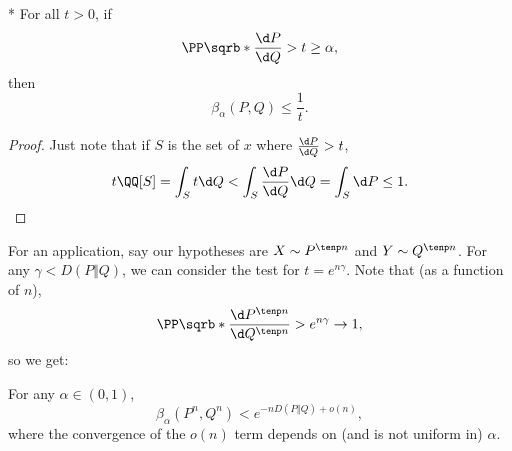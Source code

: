 \begin{cor}*
	For all $t > 0$, if \[
		\PP\sqrb*{\frac{\d P}{\d Q} > t} \geq \alpha,
	\]
	then \[
		\beta_\alpha(P,Q) \leq \frac 1t.
	\]
\end{cor}

\begin{proof}
	Just note that if $S$ is the set of $x$ where $\frac{\d P}{\d Q} > t$, \[
		t\QQ[S] = \int_S t\d Q < \int_S \frac{\d P}{\d Q} \d Q = \int_S \d P \leq 1.
	\]
\end{proof}

For an application, say our hypotheses are $X\sim P^{\tenp n}$ and $Y\sim Q^{\tenp n}$. For any $\gamma < D(P\Vert Q)$, we can consider the test for $t = e^{n\gamma}$.
Note that (as a function of $n$), \[
	\PP\sqrb*{\frac{\d P^{\tenp n}}{\d Q^{\tenp n}} > e^{n\gamma}} \to 1,
\]
so we get:

\begin{thm}
	For any $\alpha \in (0,1)$, \[
		\beta_\alpha(P^n, Q^n) < e^{-nD(P\Vert Q) + o(n)},
	\]
	where the convergence of the $o(n)$ term depends on (and is not uniform in) $\alpha$.
\end{thm}
